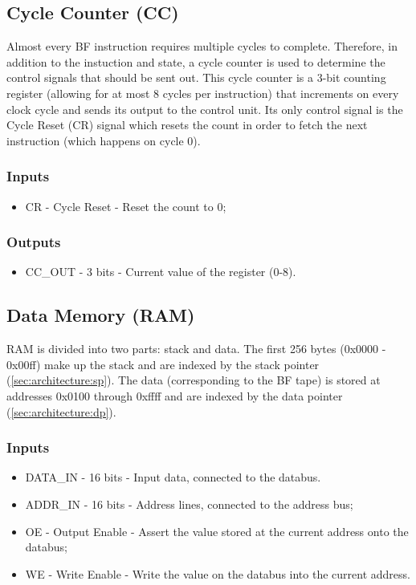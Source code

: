 \subsection{Cycle Counter (CC)} \label{sec:architecture:cc}
Almost every BF instruction requires multiple cycles to complete. Therefore, in addition to the instuction and state, a cycle counter is used to determine the control signals that should be sent out.  This cycle counter is a 3-bit counting register (allowing for at most 8 cycles per instruction) that increments on every clock cycle and sends its output to the control unit. Its only control signal is the Cycle Reset (CR) signal which resets the count in order to fetch the next instruction (which happens on cycle 0).

\subsubsection*{Inputs}
\begin{itemize}
\itemsep0em
\item CR - Cycle Reset - Reset the count to 0;
\end{itemize}

\subsubsection*{Outputs}
\begin{itemize}
\itemsep0em
\item CC\_OUT - 3 bits - Current value of the register (0-8).
\end{itemize}

\subsection{Data Memory (RAM)}  \label{sec:architecture:ram}
RAM is divided into two parts: stack and data. The first 256 bytes (0x0000 - 0x00ff) make up the stack and are indexed by the stack pointer (\ref{sec:architecture:sp}). The data (corresponding to the BF tape) is stored at addresses 0x0100 through 0xffff and are indexed by the data pointer (\ref{sec:architecture:dp}). 

\subsubsection*{Inputs}
\begin{itemize}
\itemsep0em 
\item DATA\_IN - 16 bits - Input data, connected to the databus.
\item ADDR\_IN - 16 bits - Address lines, connected to the address bus;
\item OE - Output Enable - Assert the value stored at the current address onto the databus;
\item WE - Write Enable - Write the value on the databus into the current address.
\end{itemize}

